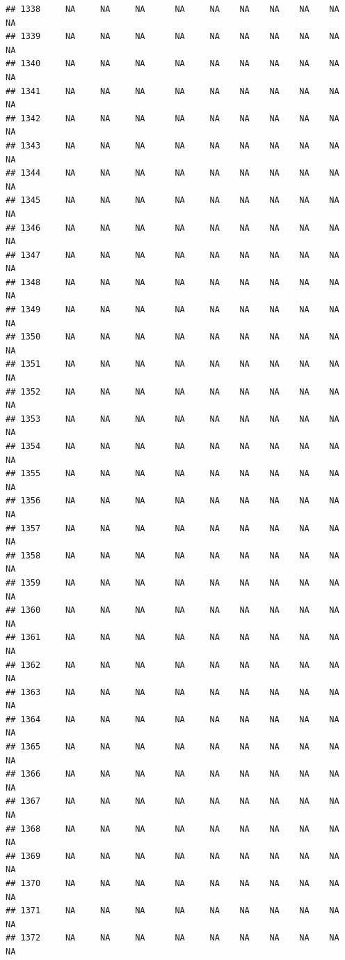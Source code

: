 \documentclass{article}\usepackage{graphicx, color}
\makeatletter
\newenvironment{kframe}{%
 \def\at@end@of@kframe{}%
 \ifinner\ifhmode%
  \def\at@end@of@kframe{\end{minipage}}%
  \begin{minipage}{\columnwidth}%
 \fi\fi%
 \def\FrameCommand##1{\hskip\@totalleftmargin \hskip-\fboxsep
 \colorbox{shadecolor}{##1}\hskip-\fboxsep
     \hskip-\linewidth \hskip-\@totalleftmargin \hskip\columnwidth}%
 \MakeFramed {\advance\hsize-\width
   \@totalleftmargin\z@ \linewidth\hsize
   \@setminipage}}%
 {\par\unskip\endMakeFramed%
 \at@end@of@kframe}
\newenvironment{knitrout}{}{} %
\makeatother
\begin{document}
\begin{knitrout}
\begin{kframe}
\begin{verbatim}
## 1338     NA     NA     NA      NA     NA    NA    NA    NA    NA     NA
## 1339     NA     NA     NA      NA     NA    NA    NA    NA    NA     NA
## 1340     NA     NA     NA      NA     NA    NA    NA    NA    NA     NA
## 1341     NA     NA     NA      NA     NA    NA    NA    NA    NA     NA
## 1342     NA     NA     NA      NA     NA    NA    NA    NA    NA     NA
## 1343     NA     NA     NA      NA     NA    NA    NA    NA    NA     NA
## 1344     NA     NA     NA      NA     NA    NA    NA    NA    NA     NA
## 1345     NA     NA     NA      NA     NA    NA    NA    NA    NA     NA
## 1346     NA     NA     NA      NA     NA    NA    NA    NA    NA     NA
## 1347     NA     NA     NA      NA     NA    NA    NA    NA    NA     NA
## 1348     NA     NA     NA      NA     NA    NA    NA    NA    NA     NA
## 1349     NA     NA     NA      NA     NA    NA    NA    NA    NA     NA
## 1350     NA     NA     NA      NA     NA    NA    NA    NA    NA     NA
## 1351     NA     NA     NA      NA     NA    NA    NA    NA    NA     NA
## 1352     NA     NA     NA      NA     NA    NA    NA    NA    NA     NA
## 1353     NA     NA     NA      NA     NA    NA    NA    NA    NA     NA
## 1354     NA     NA     NA      NA     NA    NA    NA    NA    NA     NA
## 1355     NA     NA     NA      NA     NA    NA    NA    NA    NA     NA
## 1356     NA     NA     NA      NA     NA    NA    NA    NA    NA     NA
## 1357     NA     NA     NA      NA     NA    NA    NA    NA    NA     NA
## 1358     NA     NA     NA      NA     NA    NA    NA    NA    NA     NA
## 1359     NA     NA     NA      NA     NA    NA    NA    NA    NA     NA
## 1360     NA     NA     NA      NA     NA    NA    NA    NA    NA     NA
## 1361     NA     NA     NA      NA     NA    NA    NA    NA    NA     NA
## 1362     NA     NA     NA      NA     NA    NA    NA    NA    NA     NA
## 1363     NA     NA     NA      NA     NA    NA    NA    NA    NA     NA
## 1364     NA     NA     NA      NA     NA    NA    NA    NA    NA     NA
## 1365     NA     NA     NA      NA     NA    NA    NA    NA    NA     NA
## 1366     NA     NA     NA      NA     NA    NA    NA    NA    NA     NA
## 1367     NA     NA     NA      NA     NA    NA    NA    NA    NA     NA
## 1368     NA     NA     NA      NA     NA    NA    NA    NA    NA     NA
## 1369     NA     NA     NA      NA     NA    NA    NA    NA    NA     NA
## 1370     NA     NA     NA      NA     NA    NA    NA    NA    NA     NA
## 1371     NA     NA     NA      NA     NA    NA    NA    NA    NA     NA
## 1372     NA     NA     NA      NA     NA    NA    NA    NA    NA     NA

\end{verbatim}
\end{kframe}
\end{knitrout}
\end{document}
